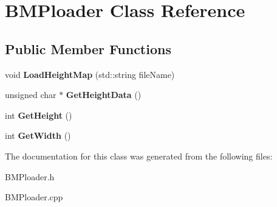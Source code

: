 \hypertarget{class_b_m_ploader}{\section{B\-M\-Ploader Class Reference}
\label{class_b_m_ploader}
}
\subsection*{Public Member Functions}
\begin{DoxyCompactItemize}
\item 
\hypertarget{class_b_m_ploader_ab1d28705a67d1ae88e6445074203c923}{void {\bfseries Load\-Height\-Map} (std\-::string file\-Name)}\label{class_b_m_ploader_ab1d28705a67d1ae88e6445074203c923}

\item 
\hypertarget{class_b_m_ploader_a06ba642c921d399b8ca3168db0475f26}{unsigned char $\ast$ {\bfseries Get\-Height\-Data} ()}\label{class_b_m_ploader_a06ba642c921d399b8ca3168db0475f26}

\item 
\hypertarget{class_b_m_ploader_afc434736d8bc989d769152ab57b14220}{int {\bfseries Get\-Height} ()}\label{class_b_m_ploader_afc434736d8bc989d769152ab57b14220}

\item 
\hypertarget{class_b_m_ploader_a3ef1ab3e286c7cd23d337fa25d379575}{int {\bfseries Get\-Width} ()}\label{class_b_m_ploader_a3ef1ab3e286c7cd23d337fa25d379575}

\end{DoxyCompactItemize}


The documentation for this class was generated from the following files\-:\begin{DoxyCompactItemize}
\item 
B\-M\-Ploader.\-h\item 
B\-M\-Ploader.\-cpp\end{DoxyCompactItemize}
